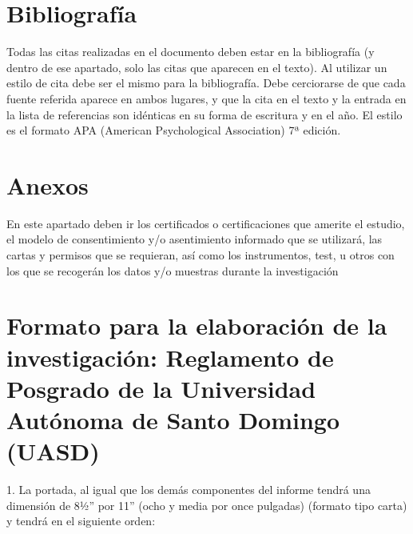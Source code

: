\documentclass[12pt,a4paper]{article}
\begin{document}

\section{Bibliografía}

\noindent
Todas las citas realizadas en el documento deben estar en la bibliografía (y dentro de ese apartado, solo las citas que aparecen en el texto). Al utilizar un estilo de cita debe ser el mismo para
la bibliografía. Debe cerciorarse de que cada fuente referida aparece en ambos
lugares, y que la cita en el texto y la entrada en la lista de referencias son idénticas en
su forma de escritura y en el año. El estilo es el formato APA (American Psychological Association) 7ª edición.\\


\section{Anexos}
\noindent
En este apartado deben ir los certificados o certificaciones que amerite el estudio, el
modelo de consentimiento y/o asentimiento informado que se utilizará, las cartas y
permisos que se requieran, así como los instrumentos, test, u otros con los que se
recogerán los datos y/o muestras durante la investigación

\section{Formato para la elaboración de la investigación: Reglamento de Posgrado de la Universidad Autónoma de Santo Domingo (UASD)}

1. La portada, al igual que los demás componentes del informe tendrá una dimensión de 8½”
por 11” (ocho y media por once pulgadas) (formato tipo carta) y tendrá en el siguiente
orden:
\end{document}
